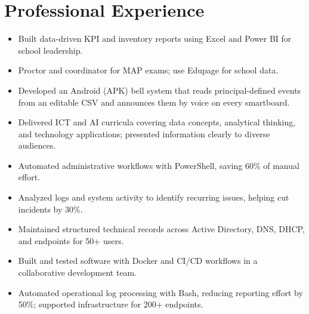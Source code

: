 \documentclass[a4paper,10pt]{article}
\begin{document}
\section*{Professional Experience}
\begin{itemize}
  \item Built data-driven KPI and inventory reports using Excel and Power BI for school leadership.
  \item Proctor and coordinator for MAP exams; use Edupage for school data.
  \item Developed an Android (APK) bell system that reads principal-defined events from an editable CSV and announces them by voice on every smartboard.
\end{itemize}
\begin{itemize}
  \item Delivered ICT and AI curricula covering data concepts, analytical thinking, and technology applications; presented information clearly to diverse audiences.
\end{itemize}
\begin{itemize}
  \item Automated administrative workflows with PowerShell, saving 60\% of manual effort.
  \item Analyzed logs and system activity to identify recurring issues, helping cut incidents by 30\%.
  \item Maintained structured technical records across Active Directory, DNS, DHCP, and endpoints for 50+ users.
\end{itemize}
\begin{itemize}
  \item Built and tested software with Docker and CI/CD workflows in a collaborative development team.
\end{itemize}
\begin{itemize}
  \item Automated operational log processing with Bash, reducing reporting effort by 50\%; supported infrastructure for 200+ endpoints.
\end{itemize}
\end{document}
